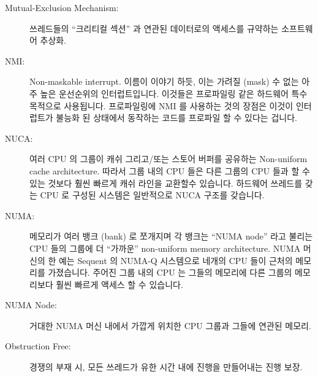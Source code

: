 \begin{description}
\fi

\item[Mutual-Exclusion Mechanism:]
	쓰레드들의 ``크리티컬 섹션'' 과 연관된 데이터로의 액세스를 규약하는
	소프트웨어 추상화.
\item[NMI:]
	Non-maskable interrupt.
	이름이 이야기 하듯, 이는 가려질 (mask) 수 없는 아주 높은 운선순위의
	인터럽트입니다.
	이것들은 프로파일링 같은 하드웨어 특수 목적으로 사용됩니다.
	프로파일링에 NMI 를 사용하는 것의 장점은 이것이 인터럽트가 불능화 된
	상태에서 동작하는 코드를 프로파일 할 수 있다는 겁니다.
\item[NUCA:]
	여러 CPU 의 그룹이 캐쉬 그리고/또는 스토어 버퍼를 공유하는 Non-uniform
	cache architecture.
	따라서 그룹 내의 CPU 들은 다른 그룹의 CPU 들과 할 수 있는 것보다 훨씬
	빠르게 캐쉬 라인을 교환할수 있습니다.
	하드웨어 쓰레드를 갖는 CPU 로 구성된 시스템은 일반적으로 NUCA 구조를
	갖습니다.

\iffalse

\item[Mutual-Exclusion Mechanism:]\index{Mutual-exclusion mechanism}
	A software abstraction that regulates threads' access to
	``critical sections'' and corresponding data.
\item[NMI:]\index{NMI}
	Non-maskable interrupt.
	As the name indicates, this is an extremely high-priority
	interrupt that cannot be masked.
	These are used for hardware-specific purposes such as profiling.
	The advantage of using NMIs for profiling is that it allows you
	to profile code that runs with interrupts disabled.
\item[NUCA:]\index{NUCA}
	Non-uniform cache architecture, where groups of CPUs share
	caches and/or store buffers.
	CPUs in a group can therefore exchange cache lines with each
	other much more quickly than they can with CPUs in other groups.
	Systems comprised of CPUs with hardware threads will generally
	have a NUCA architecture.

\fi

\item[NUMA:]
	메모리가 여러 뱅크 (bank) 로 쪼개지며 각 뱅크는 ``NUMA node'' 라고
	불리는 CPU 들의 그룹에 더 ``가까운'' non-uniform memory architecture.
	NUMA 머신의 한 예는 Sequent 의 NUMA-Q 시스템으로 네개의 CPU 들이 근처의
	메모리를 가졌습니다.
	주어진 그룹 내의 CPU 는 그들의 메모리에 다른 그룹의 메모리보다 훨씬
	빠르게 액세스 할 수 있습니다.
\item[NUMA Node:]
	거대한 NUMA 머신 내에서 가깝게 위치한 CPU 그룹과 그들에 연관된 메모리.
\item[Obstruction Free:]
	경쟁의 부재 시, 모든 쓰레드가 유한 시간 내에 진행을 만들어내는 진행
	보장.


\end{description}

